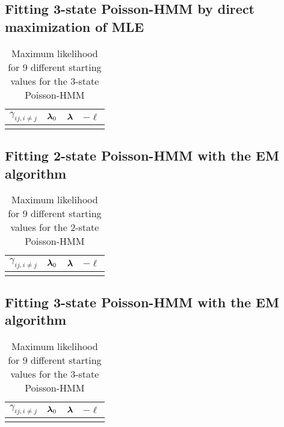 \subsection{Fitting 3-state Poisson-HMM by direct maximization of MLE}
\label{app:3-state-ml-results}

\begin{table}[ht]
    \centering
    \begin{tabular}{cccc}
        $\gamma_{ij, i\neq j}$ & $\boldsymbol{\lambda}_0$ & $\boldsymbol{\lambda}$ & $-\ell$ \\\hline
        }
    \end{tabular}
    \caption{Maximum likelihood for 9 different starting values for the 3-state Poisson-HMM}
    \label{tbl:3-state-fits}
\end{table}
\FloatBarrier
\pagebreak

\subsection{Fitting 2-state Poisson-HMM with the EM algorithm}
\label{app:2-state-em-results}

\begin{table}[ht]
    \centering
    \begin{tabular}{cccc}
        $\gamma_{ij, i\neq j}$ & $\boldsymbol{\lambda}_0$ & $\boldsymbol{\lambda}$ & $-\ell$ \\\hline
        }
    \end{tabular}
    \caption{Maximum likelihood for 9 different starting values for the 2-state Poisson-HMM}
    \label{tbl:2-state-fits-em}
\end{table}
\FloatBarrier
\pagebreak

\subsection{Fitting 3-state Poisson-HMM with the EM algorithm}
\label{app:3-state-em-results}

\begin{table}[ht]
    \centering
    \begin{tabular}{cccc}
        $\gamma_{ij, i\neq j}$ & $\boldsymbol{\lambda}_0$ & $\boldsymbol{\lambda}$ & $-\ell$ \\\hline
        }
    \end{tabular}
    \caption{Maximum likelihood for 9 different starting values for the 3-state Poisson-HMM}
    \label{tbl:3-state-fits-em}
\end{table}
\FloatBarrier
\pagebreak

